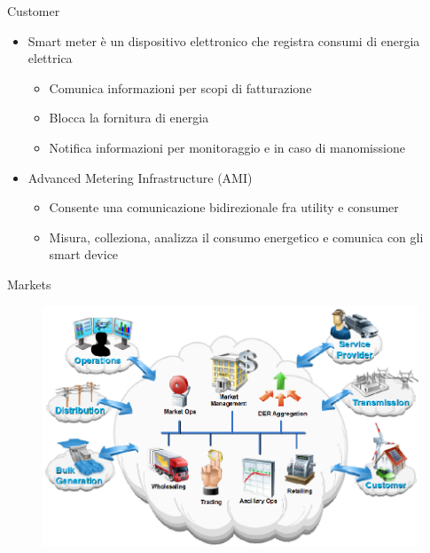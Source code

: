 \begin{frame}[fragile]{Customer} 
	\begin{itemize}[<+- | alert@+>]
		\item Smart meter è un dispositivo elettronico che registra consumi di energia elettrica
		\begin{itemize}
			\item Comunica informazioni per scopi di fatturazione
			\item Blocca la fornitura di energia  %
			\item Notifica informazioni per monitoraggio e in caso di manomissione %
		\end{itemize}		 
		\item Advanced Metering Infrastructure  (AMI)%
		\begin{itemize}
			\item Consente una comunicazione bidirezionale fra utility e consumer %
			\item Misura, colleziona, analizza il consumo energetico e comunica con gli smart device
		\end{itemize}			
	\end{itemize}
\end{frame}


\begin{frame}[fragile]{Markets}
	\begin{figure}[h] 
		\includegraphics[scale=0.45]{imgs/market.png}
	\end{figure}
\end{frame}

